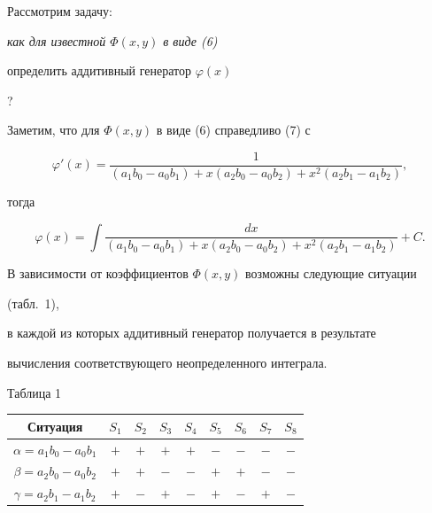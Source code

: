 Рассмотрим задачу: {\it как для известной $\Phi(x,y)$ в виде {\em (6)}


определить аддитивный генератор $\varphi(x)$}?





Заметим, что для $\Phi(x,y)$ в виде (6) справедливо (7) с


$$


\varphi'(x)=\frac{1}


{(a_1b_0-a_0b_1)+x(a_2b_0-a_0b_2)+x^2(a_2b_1-a_1b_2)},


$$


тогда


\begin{equation}


\varphi(x)=\int\frac{dx}


{(a_1b_0-a_0b_1)+x(a_2b_0-a_0b_2)+x^2(a_2b_1-a_1b_2)}+C.


\end{equation}





В зависимости от коэффициентов $\Phi(x,y)$ возможны следующие ситуации


(табл.~1),


в каждой из которых аддитивный генератор получается в результате


вычисления соответствующего неопределенного интеграла.





{\hspace{107mm} Таблица 1}





{\hfill


\begin{tabular}{|c|c|c|c|c|c|c|c|c|}


\hline


Ситуация & $S_1$ & $S_2$ & $S_3$ & $S_4$ & $S_5$ & $S_6$


& $S_7$ & $S_8$\\


\hline


$\alpha=a_1b_0-a_0b_1$ &$+$ &$+$ &$+$ &$+$ &$-$ &$-$ &$-$ &$-$\\


\hline


$\beta=a_2b_0-a_0b_2$ &$+$ &$+$ &$-$ &$-$ &$+$ &$+$ &$-$ &$-$\\


\hline


$\gamma=a_2b_1-a_1b_2$ &$+$ &$-$ &$+$ &$-$ &$+$ &$-$ &$+$ &$-$\\


\hline


\end{tabular}


\hfill}


